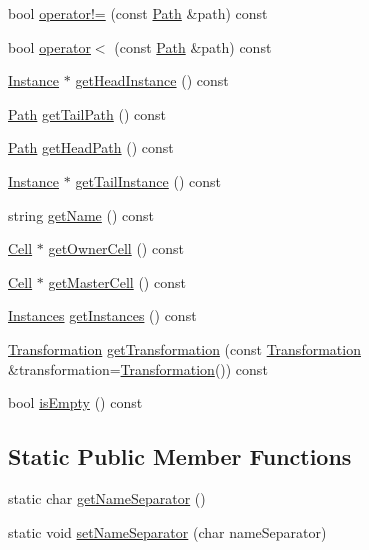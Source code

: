 \begin{DoxyCompactItemize}
bool \hyperlink{classHurricane_1_1Path_abf4ab836ccd038cf26836032bde1b3c4}{operator!=} (const \hyperlink{classHurricane_1_1Path}{Path} \&path) const 
\item 
bool \hyperlink{classHurricane_1_1Path_afb1f1812bfc357624331215eb077dc68}{operator$<$} (const \hyperlink{classHurricane_1_1Path}{Path} \&path) const 
\item 
\hyperlink{classHurricane_1_1Instance}{Instance} $\ast$ \hyperlink{classHurricane_1_1Path_afcca460136f6790118234aa943bf84f3}{get\-Head\-Instance} () const 
\item 
\hyperlink{classHurricane_1_1Path}{Path} \hyperlink{classHurricane_1_1Path_a29970d03405f8cf77458d1e0d4d701b9}{get\-Tail\-Path} () const 
\item 
\hyperlink{classHurricane_1_1Path}{Path} \hyperlink{classHurricane_1_1Path_ad1ea2ac96ec21ba0dfda1365497cc563}{get\-Head\-Path} () const 
\item 
\hyperlink{classHurricane_1_1Instance}{Instance} $\ast$ \hyperlink{classHurricane_1_1Path_a7df52f50c6bf2bc1bc10e766cab3b304}{get\-Tail\-Instance} () const 
\item 
string \hyperlink{classHurricane_1_1Path_aa0656f8a7d9e701edbe624c0efdd10f3}{get\-Name} () const 
\item 
\hyperlink{classHurricane_1_1Cell}{Cell} $\ast$ \hyperlink{classHurricane_1_1Path_a1dc8d8057b422450d05b26cfcdcb6403}{get\-Owner\-Cell} () const 
\item 
\hyperlink{classHurricane_1_1Cell}{Cell} $\ast$ \hyperlink{classHurricane_1_1Path_aed25b7b0da4dccdd05cda78d8be7a375}{get\-Master\-Cell} () const 
\item 
\hyperlink{namespaceHurricane_ac9436b03a2926f34ad6863deae2baadc}{Instances} \hyperlink{classHurricane_1_1Path_a1b4c8b9cd62874595636ea696e65cbb9}{get\-Instances} () const 
\item 
\hyperlink{classHurricane_1_1Transformation}{Transformation} \hyperlink{classHurricane_1_1Path_a839cfc6dd46e161244dfa7055ad8c67a}{get\-Transformation} (const \hyperlink{classHurricane_1_1Transformation}{Transformation} \&transformation=\hyperlink{classHurricane_1_1Transformation}{Transformation}()) const 
\item 
bool \hyperlink{classHurricane_1_1Path_ad5f826df43e63889d9f80308f5e8d82e}{is\-Empty} () const 
\end{DoxyCompactItemize}
\subsection*{Static Public Member Functions}
\begin{DoxyCompactItemize}
\item 
static char \hyperlink{classHurricane_1_1Path_ac63015239df43b8c44a6d74a262eb3a2}{get\-Name\-Separator} ()
\item 
static void \hyperlink{classHurricane_1_1Path_a505231a4bf7e8041c7a01e482505cd7a}{set\-Name\-Separator} (char name\-Separator)
\end{DoxyCompactItemize}


